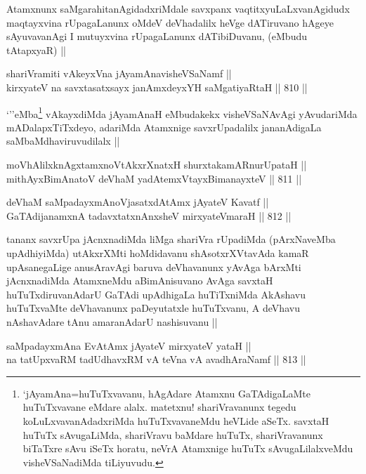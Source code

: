 \begin{artha}
Atamxnunx saMgarahitanAgidadxriMdale savxpanx vaqtitxyuLaLxvanAgidudx maqtayxvina rUpagaLanunx oMdeV deVhadalilx heVge dATiruvano hAgeye sAyuvavanAgi I mutuyxvina rUpagaLanunx dATibiDuvanu, (eMbudu tAtapxyaR) ||
\end{artha}

\begin{shl}
shariVramiti vAkeyxVna jAyamAnavisheVSaNamf || \\
kirxyateV na savxtasatxsayx janAmxdeyxYH saMgatiyaRtaH ||  810 ||  
\end{shl}

\begin{artha}
`\stext''eMba\footnote{`jAyamAna=huTuTxvavanu, hAgAdare Atamxnu GaTAdigaLaMte huTuTxvavane eMdare alalx. matetxnu! shariVravanunx tegedu koLuLxvavanAdadxriMda huTuTxvavaneMdu heVLide aSeTx. savxtaH huTuTx sAvugaLiMda, shariVravu baMdare huTuTx, shariVravanunx biTaTxre sAvu iSeTx horatu, neVrA Atamxnige huTuTx sAvugaLilalxveMdu visheVSaNadiMda tiLiyuvudu.} vAkayxdiMda jAyamAnaH eMbudakekx visheVSaNAvAgi yAvudariMda mADalapxTiTxdeyo, adariMda Atamxnige savxrUpadalilx jananAdigaLa saMbaMdhaviruvudilalx ||
\end{artha}

\begin{shl}
moVhAlilxknAgxtamxnoVtAkxrXnatxH shurxtakamARnurUpataH || \\
mithAyxBimAnatoV deVhaM yadA\s \s temxVtayxBimanayxteV ||  811 ||  
\end{shl}
				
\begin{shl}
deVhaM saMpadayxmAnoV\s jasatxdA\s \s tAmx jAyateV Kavatf ||  \\
GaTAdijanamxnA tadavxtatxnAnxsheV mirxyateV\s maraH ||  812 ||  
\end{shl}

\begin{artha}
tananx savxrUpa jAcnxnadiMda liMga shariVra rUpadiMda (pArxNaveMba upAdhiyiMda) utAkxrXMti hoMdidavanu shAsotxrXVtavAda kamaR upAsanegaLige anusAravAgi baruva deVhavanunx yAvAga bArxMti jAcnxnadiMda AtamxneMdu aBimAnisuvano AvAga savxtaH huTuTxdiruvanAdarU GaTAdi upAdhigaLa huTiTxniMda AkAshavu huTuTxvaMte deVhavanunx paDeyutatxle huTuTxvanu, A deVhavu nAshavAdare tAnu amaranAdarU nashisuvanu ||
\end{artha}

\begin{shl}
saMpadayxmAna EvA\s \s tAmx jAyateV mirxyateV yataH ||  \\
na tatUpxvaRM tadUdhavxRM vA teVna vA avadhAraNamf ||  813 ||  
\end{shl}

